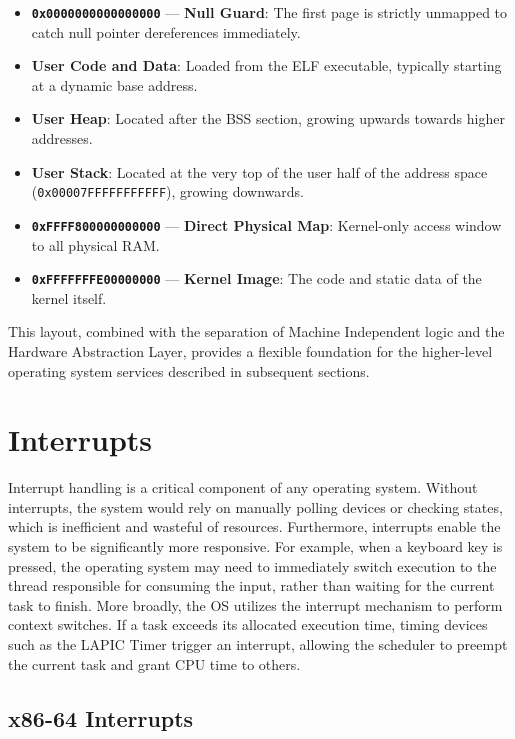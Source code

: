 \documentclass[a4paper,10pt,twoside]{report}
\theoremstyle{definition}
\begin{document}
\begin{itemize}
    \item \textbf{\texttt{0x0000000000000000}} --- \textbf{Null Guard}: The first page is strictly unmapped to catch null pointer dereferences immediately.
    \item \textbf{User Code and Data}: Loaded from the ELF executable, typically starting at a dynamic base address.
    \item \textbf{User Heap}: Located after the BSS section, growing upwards towards higher addresses.
    \item \textbf{User Stack}: Located at the very top of the user half of the address space (\texttt{0x00007FFFFFFFFFFF}), growing downwards.
    \item \textbf{\texttt{0xFFFF800000000000}} --- \textbf{Direct Physical Map}: Kernel-only access window to all physical RAM.
    \item \textbf{\texttt{0xFFFFFFFE00000000}} --- \textbf{Kernel Image}: The code and static data of the kernel itself.
\end{itemize}

This layout, combined with the separation of Machine Independent logic and the Hardware Abstraction Layer, provides a flexible foundation for the higher-level operating system services described in subsequent sections.

\section{Interrupts}
\label{sec:interrupts}

Interrupt handling is a critical component of any operating system. Without interrupts, the system would rely on manually polling devices or checking states, which is inefficient and wasteful of resources. Furthermore, interrupts enable the system to be significantly more responsive. For example, when a keyboard key is pressed, the operating system may need to immediately switch execution to the thread responsible for consuming the input, rather than waiting for the current task to finish. More broadly, the OS utilizes the interrupt mechanism to perform context switches. If a task exceeds its allocated execution time, timing devices such as the LAPIC Timer trigger an interrupt, allowing the scheduler to preempt the current task and grant CPU time to others.

\subsection{x86-64 Interrupts}
\end{document}
